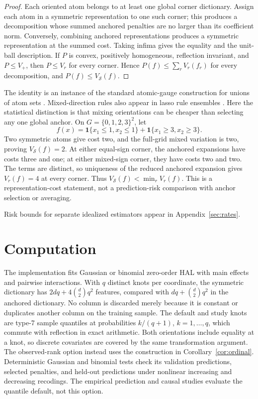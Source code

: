 \documentclass[11pt]{article}
\theoremstyle{definition}
\theoremstyle{remark}
\newcommand{\one}{\mathbf{1}}
\begin{document}
\begin{proof}
Each oriented atom belongs to at least one global corner dictionary.
Assign each atom in a symmetric representation to one such corner; this
produces a decomposition whose summed anchored penalties are no larger
than its coefficient norm. Conversely, combining anchored representations
produces a symmetric representation at the summed cost. Taking infima
gives the equality and the unit-ball description. If $P$ is convex,
positively homogeneous, reflection invariant, and $P\le V_{+}$, then
$P\le V_r$ for every corner. Hence $P(f)\le\sum_r V_r(f_r)$ for every
decomposition, and $P(f)\le V_{\mathcal S}(f)$.
\end{proof}

The identity is an instance of the standard atomic-gauge construction for
unions of atom sets \citep{vinyes2016}. Mixed-direction rules also appear
in lasso rule ensembles \citep{friedman2008}. Here the statistical
distinction is that
mixing orientations can be cheaper than selecting any one global anchor.
On $G=\{0,1,2,3\}^2$, let
\[
 f(x)=\one\{x_1\le1,x_2\le1\}+\one\{x_1\ge3,x_2\ge3\}.
\]
Two symmetric atoms give cost two, and the full-grid mixed variation is
two, proving $V_{\mathcal S}(f)=2$. At either equal-sign corner, the
anchored expansions have costs three and one; at either mixed-sign corner,
they have costs two and two. The terms are distinct, so uniqueness of the
reduced anchored expansion gives $V_r(f)=4$ at every corner. Thus
$V_{\mathcal S}(f)<\min_r V_r(f)$. This is a representation-cost statement,
not a prediction-risk comparison with anchor selection or averaging.

Risk bounds for separate idealized estimators appear in
Appendix~\ref{sec:rates}.

\section{Computation}\label{sec:comp}

The implementation fits Gaussian or binomial zero-order HAL with main
effects and pairwise interactions. With $q$ distinct knots per
coordinate, the symmetric dictionary has
$2dq+4\binom{d}{2}q^2$ features, compared with
$dq+\binom{d}{2}q^2$ in the anchored dictionary. No column is discarded
merely because it is constant or duplicates another column on the training
sample. The default and study knots are type-7 sample quantiles at probabilities
$k/(q+1)$, $k=1,\ldots,q$, which commute with reflection in exact arithmetic.
Both orientations include equality at a knot, so discrete covariates are
covered by the same transformation argument.
The observed-rank option instead uses the construction in
Corollary~\ref{cor:ordinal}. Deterministic Gaussian and binomial tests check
its validation predictions, selected penalties, and held-out predictions
under nonlinear increasing and decreasing recodings. The empirical
prediction and causal studies evaluate the quantile default, not this option.
\end{document}
